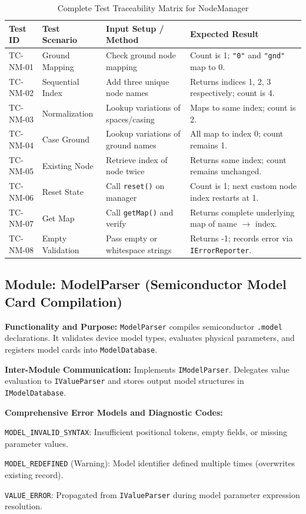 \begin{table}[H]
\centering
\small
\begin{tabular}{|l|l|p{4.5cm}|p{4.5cm}|}
\hline
\textbf{Test ID} & \textbf{Test Scenario} & \textbf{Input Setup / Method} & \textbf{Expected Result} \\
\hline
TC-NM-01 & Ground Mapping & Check ground node mapping & Count is 1; \texttt{"0"} and \texttt{"gnd"} map to 0. \\
\hline
TC-NM-02 & Sequential Index & Add three unique node names & Returns indices 1, 2, 3 respectively; count is 4. \\
\hline
TC-NM-03 & Normalization & Lookup variations of spaces/casing & Maps to same index; count is 2. \\
\hline
TC-NM-04 & Case Ground & Lookup variations of ground names & All map to index 0; count remains 1. \\
\hline
TC-NM-05 & Existing Node & Retrieve index of node twice & Returns same index; count remains unchanged. \\
\hline
TC-NM-06 & Reset State & Call \texttt{reset()} on manager & Count is 1; next custom node index restarts at 1. \\
\hline
TC-NM-07 & Get Map & Call \texttt{getMap()} and verify & Returns complete underlying map of name $\to$ index. \\
\hline
TC-NM-08 & Empty Validation & Pass empty or whitespace strings & Returns -1; records error via \texttt{IErrorReporter}. \\
\hline
\end{tabular}
\caption{Complete Test Traceability Matrix for NodeManager}
\end{table}


\subsection{Module: ModelParser (Semiconductor Model Card Compilation)}

\textbf{Functionality and Purpose:} \texttt{ModelParser} compiles semiconductor \texttt{.model} declarations. It validates device model types, evaluates physical parameters, and registers model cards into \texttt{ModelDatabase}.

\textbf{Inter-Module Communication:} Implements \texttt{IModelParser}. Delegates value evaluation to \texttt{IValueParser} and stores output model structures in \texttt{IModelDatabase}.

\textbf{Comprehensive Error Models and Diagnostic Codes:}
\begin{compactitem}
    \item \texttt{MODEL\_INVALID\_SYNTAX}: Insufficient positional tokens, empty fields, or missing parameter values.
    \item \texttt{MODEL\_REDEFINED} (Warning): Model identifier defined multiple times (overwrites existing record).
    \item \texttt{VALUE\_ERROR}: Propagated from \texttt{IValueParser} during model parameter expression resolution.
\end{compactitem}

